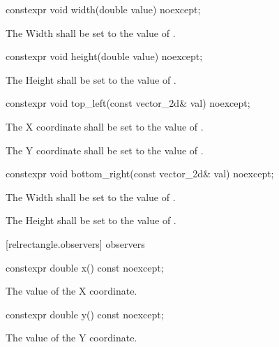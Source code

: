 \begin{itemdecl}
constexpr void width(double value) noexcept;
\end{itemdecl}
\begin{itemdescr}
\pnum
\effects
The Width shall be set to the value of .
\end{itemdescr}

\begin{itemdecl}
constexpr void height(double value) noexcept;
\end{itemdecl}
\begin{itemdescr}
\pnum
\effects
The Height shall be set to the value of .
\end{itemdescr}

\begin{itemdecl}
constexpr void top_left(const vector_2d& val) noexcept;
\end{itemdecl}
\begin{itemdescr}
\pnum
\effects
The X coordinate shall be set to the value of .

\effects
The Y coordinate shall be set to the value of .
\end{itemdescr}

\begin{itemdecl}
constexpr void bottom_right(const vector_2d& val) noexcept;
\end{itemdecl}
\begin{itemdescr}
\pnum
\effects
The Width shall be set to the value of .

\pnum
The Height shall be set to the value of .
\end{itemdescr}

 [relrectangle.observers]{ observers}

\begin{itemdecl}
constexpr double x() const noexcept;
\end{itemdecl}
\begin{itemdescr}
\pnum
\returns
The value of the X coordinate.
\end{itemdescr}

\begin{itemdecl}
constexpr double y() const noexcept;
\end{itemdecl}
\begin{itemdescr}
\pnum
\returns
The value of the Y coordinate.
\end{itemdescr}

